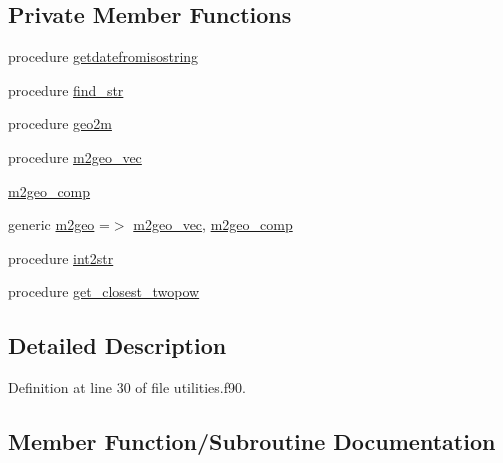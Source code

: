 \subsection*{Private Member Functions}
\begin{DoxyCompactItemize}
\item 
procedure \mbox{\hyperlink{structutilities__mod_1_1utils__class_af2c6e40cca9f6f643105eef0c16f09aa}{getdatefromisostring}}
\item 
procedure \mbox{\hyperlink{structutilities__mod_1_1utils__class_a70fcd702c2e81aaf574c3e031b7b0fef}{find\+\_\+str}}
\item 
procedure \mbox{\hyperlink{structutilities__mod_1_1utils__class_a5a63468b29d7fbd5f0549b5ef4cc5577}{geo2m}}
\item 
procedure \mbox{\hyperlink{structutilities__mod_1_1utils__class_a8319bf9d14dd225be0f30f5e0c1f04e3}{m2geo\+\_\+vec}}
\item 
\mbox{\hyperlink{structutilities__mod_1_1utils__class_a8cceeee65240f821428cd4dc65fd5fa0}{m2geo\+\_\+comp}}
\item 
generic \mbox{\hyperlink{structutilities__mod_1_1utils__class_a345230eb5aac79b78603538f0fd0e36e}{m2geo}} =$>$ \mbox{\hyperlink{structutilities__mod_1_1utils__class_a8319bf9d14dd225be0f30f5e0c1f04e3}{m2geo\+\_\+vec}}, \mbox{\hyperlink{structutilities__mod_1_1utils__class_a8cceeee65240f821428cd4dc65fd5fa0}{m2geo\+\_\+comp}}
\item 
procedure \mbox{\hyperlink{structutilities__mod_1_1utils__class_ae3a7fea394d64f5f4592504841b07777}{int2str}}
\item 
procedure \mbox{\hyperlink{structutilities__mod_1_1utils__class_a2fa5e32b744821f0c74e30aeb99e1e2b}{get\+\_\+closest\+\_\+twopow}}
\end{DoxyCompactItemize}


\subsection{Detailed Description}


Definition at line 30 of file utilities.\+f90.



\subsection{Member Function/\+Subroutine Documentation}
\mbox{\label{structutilities__mod_1_1utils__class_a70fcd702c2e81aaf574c3e031b7b0fef}} 
